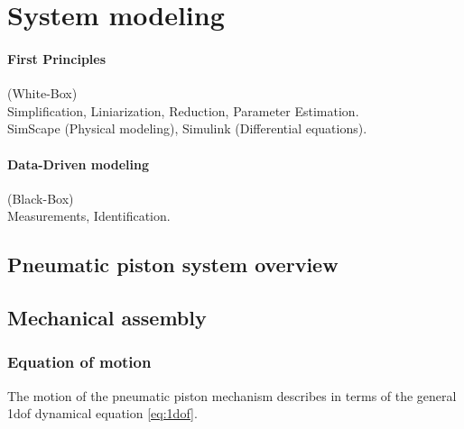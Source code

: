 \documentclass[class=article, crop=false]{standalone}
\begin{document}

\section{System modeling}

\paragraph{First Principles} (White-Box) \\
Simplification, Liniarization, Reduction, Parameter Estimation. \\
SimScape (Physical modeling), Simulink (Differential equations).

\paragraph{Data-Driven modeling}(Black-Box) \\ %
Measurements, Identification.


\subsection{Pneumatic piston system overview}


% 

\subsection{Mechanical assembly}
\subsubsection{Equation of motion}

The motion of the pneumatic piston mechanism describes in terms of the
general 1dof dynamical equation \ref{eq:1dof}. 
\end{document}
